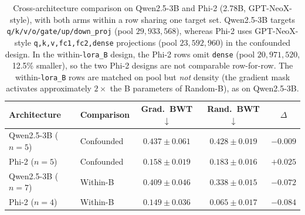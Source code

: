\begin{table}[t]
\caption{Cross-architecture comparison on Qwen2.5-3B and Phi-2 (2.78B, GPT-NeoX-style), with both arms within a row sharing one target set. Qwen2.5-3B targets \texttt{q/k/v/o/gate/up/down\_proj} (pool $29{,}933{,}568$), whereas Phi-2 uses GPT-NeoX-style \texttt{q,k,v,fc1,fc2,dense} projections (pool $23{,}592{,}960$) in the confounded design. In the within-\texttt{lora\_B} design, the Phi-2 rows omit \texttt{dense} (pool $20{,}971{,}520$, 12.5\% smaller), so the two Phi-2 designs are not comparable row-for-row. The within-\texttt{lora\_B} rows are matched on pool but \emph{not} density (the gradient mask activates approximately $2\times$ the B parameters of Random-B), as on Qwen2.5-3B.}
\label{tab:cross_arch}
\centering
\small
\begin{tabular}{@{}llccc@{}}
\toprule
\textbf{Architecture} & \textbf{Comparison} & \textbf{Grad.\ BWT $\downarrow$} & \textbf{Rand.\ BWT $\downarrow$} & \textbf{$\Delta$} \\
\midrule
Qwen2.5-3B ($n{=}5$) & Confounded & $0.437 \pm 0.061$ & $0.428 \pm 0.019$ & $-0.009$ \\
Phi-2 ($n{=}5$) & Confounded & $0.158 \pm 0.019$ & $0.183 \pm 0.016$ & $+0.025$ \\
\midrule
Qwen2.5-3B ($n{=}7$) & Within-B & $0.409 \pm 0.046$ & $0.338 \pm 0.015$ & $-0.072$ \\
Phi-2 ($n{=}4$) & Within-B & $0.149 \pm 0.036$ & $0.065 \pm 0.017$ & $-0.084$ \\
\bottomrule
\end{tabular}
\end{table} 



